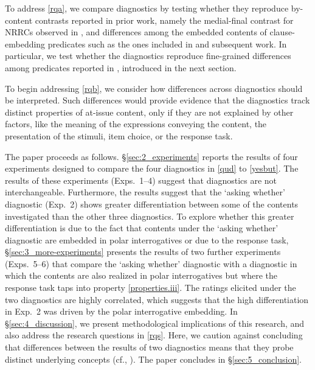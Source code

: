 \documentclass[times,linguex]{glossa}
\begin{document}
To address \ref{rqa}, we compare diagnostics by testing whether they reproduce by-content contrasts reported in prior work, namely the medial-final contrast for NRRCs observed in \citealt{syrett_experimental_2015}, and differences among the embedded contents of clause-embedding predicates such as the ones included in \citet{tonhauser_how_2018} and subsequent work. In particular, we test whether the diagnostics reproduce fine-grained differences among predicates reported in \citet{degen_projection_2025}, introduced in the next section.

To begin addressing \ref{rqb}, we consider how differences across diagnostics should be interpreted. Such differences would provide evidence that the diagnostics track distinct properties of at-issue content, only if they are not explained by other factors, like the meaning of the expressions conveying the content, the presentation of the stimuli, item choice, or the response task.


The paper proceeds as follows. \S\ref{sec:2_experiments} reports the results of four experiments designed to compare the four diagnostics in \ref{qud} to \ref{yesbut}. The results of these experiments (Exps.~1--4) suggest that diagnostics are not interchangeable. Furthermore, the results suggest that the `asking whether' diagnostic (Exp.~2) shows greater differentiation between some of the contents investigated than the other three diagnostics. To explore whether this greater differentiation is due to the fact that contents under the `asking whether' diagnostic are embedded in polar interrogatives or due to the response task, \S\ref{sec:3_more-experiments} presents the results of two further experiments (Exps.~5--6) that compare the `asking whether' diagnostic with a diagnostic in which the contents are also realized in polar interrogatives but where the response task taps into property \ref{properties.iii}. The ratings elicited under the two diagnostics are highly correlated, which suggests that the high differentiation in Exp.~2 was driven by the polar interrogative embedding. In \S\ref{sec:4_discussion}, we present methodological implications of this research, and also address the research questions in \ref{rqs}.  Here, we caution against concluding that differences between the results of two diagnostics means that they probe distinct underlying concepts (cf., \citealt{snider_anaphoric_2017,koev_notions_2018}). The paper concludes in \S\ref{sec:5_conclusion}. 
\end{document}
